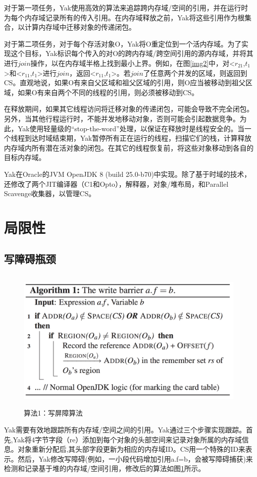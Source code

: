 对于第一项任务，Yak使用高效的算法来追踪跨内存域/空间的引用，并在运行时为每个内存域记录所有的传入引用。在内存域释放之前，Yak将这些引用作为根集合，以计算内存域中迁移对象的传递闭包。

对于第二项任务，对于每个存活对象O，Yak将O重定位到一个活内存域。为了实现这个目标，Yak标识每个传入的对O的跨内存域/跨空间引用的源内存域，并将其进行$join$操作，以在内存域半格上找到最小上界。例如，在图\ref {img2}中，对<$r_{21}$,$t_1$>和<$r_{11}$,$t_1$>进行$join$，返回<$r_{11}$,$t_1$>。若$join$了任意两个并发的区域，则返回到CS。直观地说，如果O有来自父区域和祖父区域的引用，则O应当被移动到祖父区域，如果O有来自两个不同的线程的引用，则必须被移动到CS。

在释放期间，如果其它线程访问将迁移对象的传递闭包，可能会导致不完全闭包。另外，当其他行程运行时，不能并发地移动对象，否则可能会引起数据竞争。为此，Yak使用轻量级的“stop-the-word”处理，以保证在释放时是线程安全的。当一个线程到达时域结束期，Yak暂停所有正在运行的线程，扫描它们的栈，计算释放内存域内所有潜在活对象的闭包。在其它的线程恢复前，将这些对象移动到各自的目标内存域。

Yak在Oracle的JVM OpenJDK 8 (build 25.0-b70)中实现。除了基于时域的技术，还修改了两个JIT编译器（C1和Opto），解释器，对象/堆布局，和Parallel Scavenge收集器，以管理CS。




\section{局限性}


\subsection{写障碍瓶颈}

\begin{figure}[h]
    \centering
    \includegraphics[width=12cm,height=7cm]{figure/algorithm1.jpg}
    \caption{
        算法1：写屏障算法
    }
    \label{algorithm1}
\end{figure}
Yak需要有效地跟踪所有内存域/空间之间的引用。Yak通过三个步骤实现跟踪。首先,Yak将4字节字段（re）添加到每个对象的头部空间来记录对象所属的内存域信息。对象重新分配后,其头部字段更新为相应的内存域ID。CS用一个特殊的ID来表示。然后，Yak修改写障碍(例如，一小段代码增加引用a.f=b，会被写障碍捕获)来检测和记录基于堆的内存域/空间引用，修改后的算法如图\ref{algorithm1}所示。

